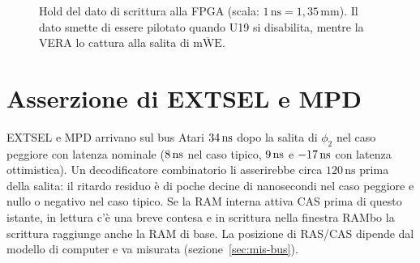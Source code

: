 \documentclass[11pt,a4paper,twoside,openright]{report}
\newcommand{\busok}[4]{%
  \draw[busv] (#2,#1) -- ++(4,0.22) -- (#3-4,#1+0.22) -- (#3,#1) -- (#3-4,#1-0.22) -- (#2+4,#1-0.22) -- cycle;
  \node[font=\tiny] at ({(#2+#3)/2},#1) {#4};}
\newcommand{\busx}[3]{%
  \fill[pattern=north east lines, pattern color=gray!70] (#2,#1-0.22) rectangle (#3,#1+0.22);
  \draw[line width=0.4pt] (#2,#1-0.22) -- (#3,#1-0.22) (#2,#1+0.22) -- (#3,#1+0.22);}
\newcommand{\ns}{\,\mathrm{ns}}
\newcommand{\sig}[1]{\textsf{#1}}
\begin{document}
\begin{figure}[htbp]
  \centering
  \caption[Hold del dato di scrittura verso la VERA]{Hold del dato di scrittura alla FPGA
  (scala: $1\ns = 1{,}35\,\mathrm{mm}$). Il dato smette di essere pilotato quando U19 si
  disabilita, mentre la VERA lo cattura alla salita di $\overline{\text{mWE}}$.}
  \label{fig:hold}
\end{figure}

\section{Asserzione di \sig{EXTSEL} e \sig{MPD}}
\label{sec:extsel}

\sig{EXTSEL} e \sig{MPD} arrivano sul bus Atari $\NwExtNomNTSC\ns$ dopo la salita di $\phi_2$
nel caso peggiore con latenza nominale ($\NwExtTNomNTSC\ns$ nel caso tipico,
$\NwExtOttNTSC\ns$ e $\NwExtTOttNTSC\ns$ con latenza ottimistica). Un decodificatore
combinatorio li asserirebbe circa $120\ns$ prima della salita: il ritardo residuo è di poche
decine di nanosecondi nel caso peggiore e nullo o negativo nel caso tipico. Se la RAM
interna attiva \sig{CAS} prima di questo istante, in lettura c'è una breve contesa e in
scrittura nella finestra RAMbo la scrittura raggiunge anche la RAM di base. La posizione di
\sig{RAS}/\sig{CAS} dipende dal modello di computer e va misurata
(sezione~\ref{sec:mis-bus}).
\end{document}
